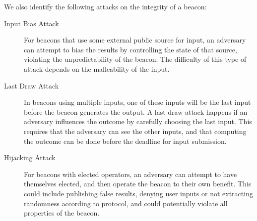\noindent%
We also identify the following attacks on the integrity of a beacon:

\begin{description}
    \item[Input Bias Attack] For beacons that use some external public source for input, an adversary can attempt to bias the results by controlling the state of that source, violating the unpredictability of the beacon.
        The difficulty of this type of attack depends on the malleability of the input.
    \item[Last Draw Attack] In beacons using multiple inputs, one of these inputs will be the last input before the beacon generates the output.
        A last draw attack happens if an adversary influences the outcome by carefully choosing the last input.
        This requires that the adversary can see the other inputs, and that computing the outcome can be done before the deadline for input submission.
    \item[Hijacking Attack] For beacons with elected operators, an adversary can attempt to have themselves elected, and then operate the beacon to their own benefit.
        This could include publishing false results, denying user inputs or not extracting randomness according to protocol, and could potentially violate all properties of the beacon. %

\end{description}
